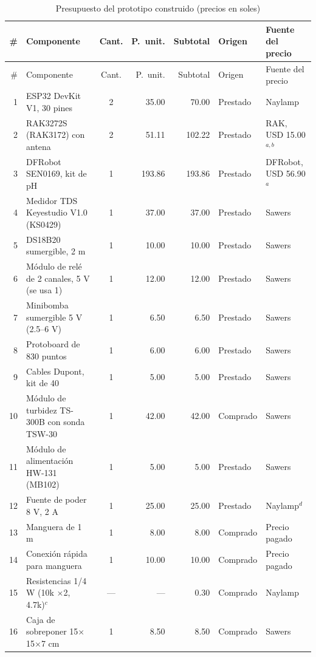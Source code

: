 {\footnotesize
\renewcommand{\arraystretch}{1.1}
\begin{longtable}{r >{\raggedright\arraybackslash}p{5.6cm} c r r l >{\raggedright\arraybackslash}p{2.6cm}}
\caption{Presupuesto del prototipo construido (precios en soles)}
\label{tab:presupuesto} \\
\toprule
\# & Componente & Cant. & P.~unit. & Subtotal & Origen & Fuente del precio \\
\midrule
\endfirsthead
\toprule
\# & Componente & Cant. & P.~unit. & Subtotal & Origen & Fuente del precio \\
\midrule
\endhead
1 & ESP32 DevKit V1, 30 pines~\cite{esp32} & 2 & 35.00 & 70.00 & Prestado & Naylamp \\
2 & RAK3272S (RAK3172) con antena~\cite{rak3172} & 2 & 51.11 & 102.22 & Prestado & RAK, USD 15.00$^{a,b}$ \\
3 & DFRobot SEN0169, kit de pH~\cite{ph_sen0169} & 1 & 193.86 & 193.86 & Prestado & DFRobot, USD 56.90$^{a}$ \\
4 & Medidor TDS Keyestudio V1.0 (KS0429)~\cite{tds} & 1 & 37.00 & 37.00 & Prestado & Sawers \\
5 & DS18B20 sumergible, 2 m~\cite{ds18} & 1 & 10.00 & 10.00 & Prestado & Sawers \\
6 & Módulo de relé de 2 canales, 5 V (se usa 1) & 1 & 12.00 & 12.00 & Prestado & Sawers \\
7 & Minibomba sumergible 5 V (2.5--6 V) & 1 & 6.50 & 6.50 & Prestado & Sawers \\
8 & Protoboard de 830 puntos & 1 & 6.00 & 6.00 & Prestado & Sawers \\
9 & Cables Dupont, kit de 40 & 1 & 5.00 & 5.00 & Prestado & Sawers \\
10 & Módulo de turbidez TS-300B con sonda TSW-30~\cite{ts300b} & 1 & 42.00 & 42.00 & Comprado & Sawers \\
11 & Módulo de alimentación HW-131 (MB102) & 1 & 5.00 & 5.00 & Prestado & Sawers \\
12 & Fuente de poder 8 V, 2 A & 1 & 25.00 & 25.00 & Prestado & Naylamp$^{d}$ \\
13 & Manguera de 1 m & 1 & 8.00 & 8.00 & Comprado & Precio pagado \\
14 & Conexión rápida para manguera & 1 & 10.00 & 10.00 & Comprado & Precio pagado \\
15 & Resistencias 1/4 W (10k $\times$2, 4.7k)$^{c}$ & --- & --- & 0.30 & Comprado & Naylamp \\
16 & Caja de sobreponer 15$\times$15$\times$7 cm & 1 & 8.50 & 8.50 & Comprado & Sawers \\

\end{longtable}}
